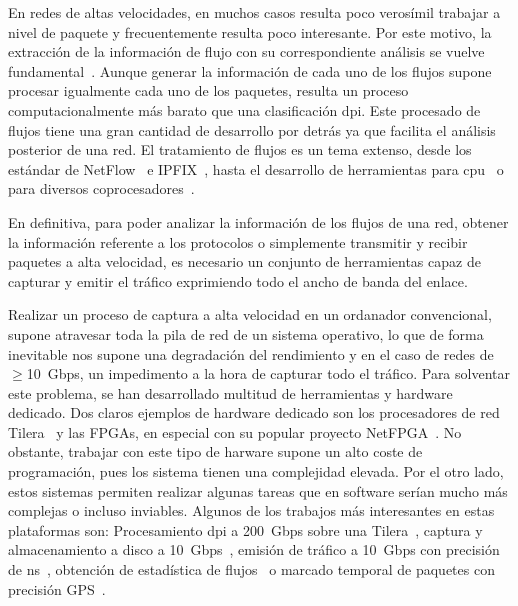 En redes de altas velocidades, en muchos casos resulta poco verosímil trabajar a nivel de paquete y frecuentemente resulta poco interesante. Por este motivo, la extracción de la información de flujo con su correspondiente análisis se vuelve fundamental~\cite{fp:pedroth}. Aunque generar la información de cada uno de los flujos supone procesar igualmente cada uno de los paquetes, resulta un proceso computacionalmente más barato que una clasificación \gls{dpi}. Este procesado de flujos tiene una gran cantidad de desarrollo por detrás ya que facilita el análisis posterior de una red. El tratamiento de flujos es un tema extenso, desde los estándar de NetFlow~\cite{claise2004cisco,rt:netflow} e IPFIX~\cite{hofstede14surveys,claise2008specification}, hasta el desarrollo de herramientas para \gls{cpu}~\cite{mckeown2008openflow,kimCOMCOM06,garcia2014low,fp:pedroth} o para diversos coprocesadores~\cite{fp:marco}.

En definitiva, para poder analizar la información de los flujos de una red, obtener la información referente a los protocolos o simplemente transmitir y recibir paquetes a alta velocidad, es necesario un conjunto de herramientas capaz de capturar y emitir el tráfico exprimiendo todo el ancho de banda del enlace.

\newpage
{}

Realizar un proceso de captura a alta velocidad en un ordanador convencional, supone atravesar toda la pila de red de un sistema operativo, lo que de forma inevitable nos supone una degradación del rendimiento y en el caso de redes de $\geq$10~Gbps, un impedimento a la hora de capturar todo el tráfico. Para solventar este problema, se han desarrollado multitud de herramientas y hardware dedicado. Dos claros ejemplos de hardware dedicado son los procesadores de red Tilera~\cite{bib:tilera} y las FPGAs, en especial con su popular proyecto NetFPGA~\cite{dpdk:netfpga}.
No obstante, trabajar con este tipo de harware supone un alto coste de programación, pues los sistema tienen una complejidad elevada. Por el otro lado, estos sistemas permiten realizar algunas tareas que en software serían mucho más complejas o incluso inviables. Algunos de los trabajos más interesantes en estas plataformas son: Procesamiento \gls{dpi} a 200~Gbps sobre una Tilera~\cite{bib:tilera:dpi200}, captura y almacenamiento a disco a 10~Gbps~\cite{zazo2014tnt10g}, emisión de tráfico a 10~Gbps con precisión de ns~\cite{zazo2014tnt10g}, obtención de estadística de flujos~\cite{fp:marco} o marcado temporal de paquetes con precisión GPS~\cite{garnica2010argos,kaemmerer2015method}.

